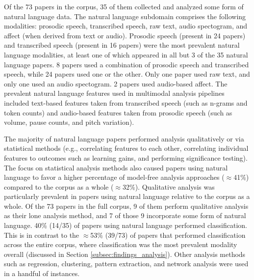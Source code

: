 \documentclass[manuscript,screen,review]{acmart}
\begin{document}
Of the 73 papers in the corpus, 35 of them collected and analyzed some form of natural language data. The natural language subdomain comprises the following modalities: prosodic speech, transcribed speech, raw text, audio spectogram, and affect (when derived from text or audio). Prosodic speech (present in 24 papers) and transcribed speech (present in 16 papers) were the most prevalent natural language modalities, at least one of which appeared in all but 3 of the 35 natural language papers. 8 papers used a combination of prosodic speech and transcribed speech, while 24 papers used one or the other. Only one paper used raw text, and only one used an audio spectogram. 2 papers used audio-based affect. The prevalent natural language features used in multimodal analysis pipelines included text-based features taken from transcribed speech (such as n-grams and token counts) and audio-based features taken from prosodic speech (such as volume, pause counts, and pitch variation). 

The majority of natural language papers performed analysis qualitatively or via statistical methods (e.g., correlating features to each other, correlating individual features to outcomes such as learning gains, and performing significance testing). The focus on statistical analysis methods also caused papers using natural language to favor a higher percentage of model-free analysis approaches ($\approx$41\%) compared to the corpus as a whole ($\approx$32\%). Qualitative analysis was particularly prevalent in papers using natural language relative to the corpus as a whole. Of the 73 papers in the full corpus, 9 of them perform qualitative analysis as their lone analysis method, and 7 of those 9 incorporate some form of natural language. 40\% (14/35) of papers using natural language performed classification. This is in contrast to the $\approx$53\% (39/73) of papers that performed classification across the entire corpus, where classification was the most prevalent modality overall (discussed in Section \ref{subsec:findings_analysis}). Other analysis methods such as regression, clustering, pattern extraction, and network analysis were used in a handful of instances.
\end{document}
